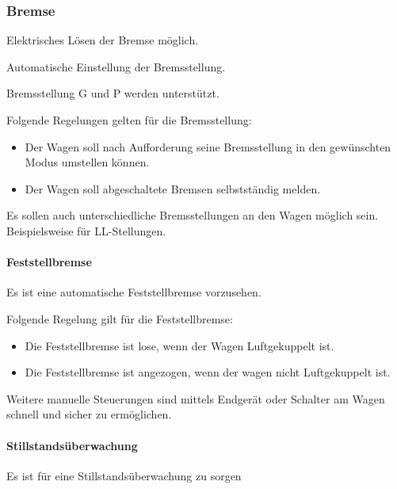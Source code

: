 \subsubsection{Bremse}
\begin{feat}
Elektrisches Lösen der Bremse möglich.
\end{feat}
\begin{feat}
Automatische Einstellung der Bremsstellung.
\end{feat}
\begin{rem}
Bremsstellung G und P werden unterstützt.
\end{rem}
\begin{rem}
Folgende Regelungen gelten für die Bremsstellung:
\begin{itemize}
    \item Der Wagen soll nach Aufforderung seine Bremsstellung in den gewünschten Modus umstellen können.
    \item Der Wagen soll abgeschaltete Bremsen selbstständig melden.
\end{itemize}
\end{rem}
\begin{rem}
Es sollen auch unterschiedliche Bremsstellungen an den Wagen möglich sein.\\
Beispielsweise für LL-Stellungen.
\end{rem}

\paragraph{Feststellbremse}
\begin{feat}
Es ist eine automatische Feststellbremse vorzusehen.
\end{feat}
\begin{rem}
Folgende Regelung gilt für die Feststellbremse:
\begin{itemize}
    \item Die Feststellbremse ist lose, wenn der Wagen Luftgekuppelt ist.
    \item Die Feststellbremse ist angezogen, wenn der wagen nicht Luftgekuppelt ist.
\end{itemize}
\end{rem}
\begin{rem}
Weitere manuelle Steuerungen sind mittels Endgerät oder Schalter am Wagen schnell und sicher zu ermöglichen.
\end{rem}

\paragraph{Stillstandsüberwachung}
\begin{feat}
Es ist für eine Stillstandsüberwachung zu sorgen
\end{feat}

